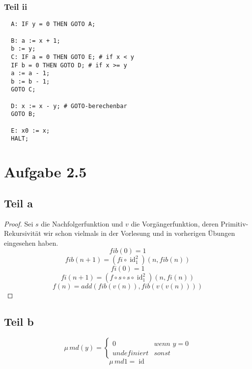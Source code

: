 \documentclass[10pt,a4paper]{article}
\DeclareMathOperator{\id}{id}
\begin{document}
\subsubsection{Teil ii}

\begin{lstlisting}
  A: IF y = 0 THEN GOTO A;

  B: a := x + 1;
  b := y;
  C: IF a = 0 THEN GOTO E; # if x < y
  IF b = 0 THEN GOTO D; # if x >= y
  a := a - 1;
  b := b - 1;
  GOTO C;

  D: x := x - y; # GOTO-berechenbar
  GOTO B;

  E: x0 := x;
  HALT;
\end{lstlisting}

\section{Aufgabe 2.5}

\subsection{Teil a}

\begin{proof}
  Sei $s$ die Nachfolgerfunktion und $v$ die Vorgängerfunktion, deren Primitiv-Rekursivität wir schon vielmals in der Vorlesung und in vorherigen Übungen eingesehen haben.
  \begin{equation}
    fib(0) = 1
  \end{equation}
  \begin{equation}
    fib(n + 1) = (fi \circ \id_{1}^{2})(n, fib(n))
  \end{equation}
  \begin{equation}
    fi(0) = 1
  \end{equation}
  \begin{equation}
    fi(n + 1) = (f \circ s \circ s \circ \id_{1}^{2})(n, fi(n))
  \end{equation}
  \begin{equation}
    f(n) = add(fib(v(n)), fib(v(v(n))))
  \end{equation}
\end{proof}

\subsection{Teil b}

\begin{equation}
  \mu\, md(y) = \begin{cases}
    0 & \textit{wenn $y = 0$}\\
    undefiniert & \textit{sonst}
  \end{cases}
\end{equation}
\begin{equation}
  \mu\, md1 = \id
\end{equation}
\end{document}
